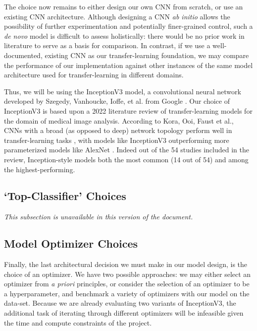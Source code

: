 The choice now remains to either design our own CNN from scratch, or use an existing CNN architecture.
Although designing a CNN \emph{ab initio} allows the possibility of further experimentation and potentially finer-grained control, such a \emph{de novo} model is difficult to assess holistically: there would be no prior work in literature to serve as a basis for comparison.
In contrast, if we use a well-documented, existing CNN as our transfer-learning foundation, we may compare the performance of our implementation against other instances of the same model architecture used for transfer-learning in different domains.

Thus, we will be using the InceptionV3 model, a convolutional neural network developed by Szegedy, Vanhoucke, Ioffe, et al. from Google \autocite{inceptionv3}. Our choice of InceptionV3 is based upon a 2022 literature review of transfer-learning models for the domain of medical image analysis. According to Kora, Ooi, Faust et al., CNNs with a broad (as opposed to deep) network topology perform well in transfer-learning tasks \autocite{kora2022}, with models like InceptionV3 outperforming more parameterized models like AlexNet \autocite{alexnet}. Indeed out of the 54 studies included in the review, Inception-style models both the most common (14 out of 54) and among the highest-performing. \autocite{kora2022}

\subsection{\enquote*{Top-Classifier} Choices}

\emph{This subsection is unavailable in this version of the document.}

\subsection{Model Optimizer Choices}

Finally, the last architectural decision we must make in our model design, is the choice of an optimizer. We have two possible approaches: we may either select an optimizer from \emph{a priori} principles, or consider the selection of an optimizer to be a hyperparameter, and benchmark a variety of optimizers with our model on the data-set. Because we are already evaluating two variants of InceptionV3, the additional task of iterating through different optimizers will be infeasible given the time and compute constraints of the project.

